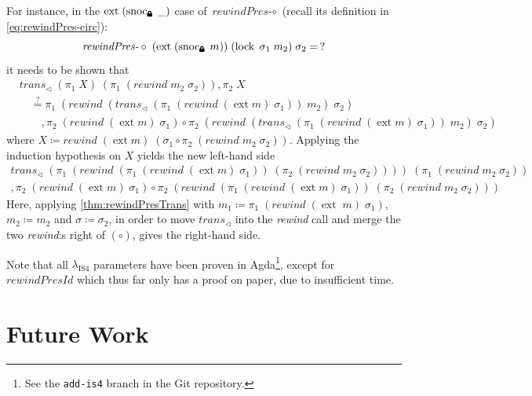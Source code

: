 \documentclass[12pt,twoside,openright]{report}
\numberwithin{equation}{chapter}
\numberwithin{figure}{chapter}
\numberwithin{table}{chapter}
\theoremstyle{definition}\newtheorem{definition}{Definition}
\newcommand{\lock}{\text{\tikz[baseline]{
      \fill[rounded corners=.1ex] (-.75ex,0) rectangle (.75ex,1ex);
      \draw[line width=.3ex] (-.4ex,.5ex) -- ++(0,.75ex) arc (180:0:.4ex) -- ++(0,-.75ex);
}}}
\begin{document}
For instance, in the $\operatorname{ext} \; (\operatorname{snoc}_\lock \; \_)$ case of $\textit{rewindPres-}\circ$
(recall its definition in \autoref{eq:rewindPres-circ}):
$$ \textit{rewindPres-}\circ \; (\operatorname{ext} \; (\operatorname{snoc}_\lock \; m)) \; (\operatorname{lock} \; \sigma_1 \; m_2) \; \sigma_2 = \, ? $$
it needs to be shown that
\begin{align*}
  &\textit{trans}_\lhd \; (\pi_1 \; X) \; (\pi_1 \; (\textit{rewind} \; m_2 \; \sigma_2)) , \pi_2 \; X \\
  &\quad \stackrel?= \pi_1 \; (\textit{rewind} \; (\textit{trans}_\lhd \; (\pi_1 \; (\textit{rewind} \; (\operatorname{ext} m) \; \sigma_1)) \; m_2) \; \sigma_2) \\
  &\qquad , \pi_2 \; (\textit{rewind} \; (\operatorname{ext} m) \; \sigma_1) \circ \pi_2 \; (\textit{rewind} \; (\textit{trans}_\lhd \; (\pi_1 \; (\textit{rewind} \; (\operatorname{ext} m) \; \sigma_1)) \; m_2) \; \sigma_2)
\end{align*}
where $X \coloneqq \textit{rewind} \; (\operatorname{ext} m) \; (\sigma_1 \circ \pi_2 \; (\textit{rewind} \; m_2 \; \sigma_2))$.
Applying the induction hypothesis on $X$ yields the new left-hand side
\begin{multline*}
  \textit{trans}_\lhd \; (\pi_1 \; (\textit{rewind} \; (\pi_1 \; (\textit{rewind} \; (\operatorname{ext} m) \; \sigma_1)) \; (\pi_2 \; (\textit{rewind} \; m_2 \; \sigma_2)))) \; (\pi_1 \; (\textit{rewind} \; m_2 \; \sigma_2)) \\
  , \pi_2 \; (\textit{rewind} \; (\operatorname{ext} m) \; \sigma_1) \circ \pi_2 \; (\textit{rewind} \; (\pi_1 \; (\textit{rewind} \; (\operatorname{ext} m) \; \sigma_1)) \; (\pi_2 \; (\textit{rewind} \; m_2 \; \sigma_2)))
\end{multline*}
Here, applying \autoref{thm:rewindPresTrans} with
$m_1 \coloneqq \pi_1 \; (\textit{rewind} \; (\operatorname{ext} \; m) \; \sigma_1)$,
$m_2 \coloneqq m_2$ and $\sigma \coloneqq \sigma_2$,
in order to move $\textit{trans}_\lhd$ into the \textit{rewind} call
and merge the two \textit{rewind}:s right of $(\circ)$,
gives the right-hand side.

Note that all $\lambda_\text{IS4}$ parameters have been proven in Agda\footnote{
See the \texttt{add-is4} branch in the Git repository.},
except for $\textit{rewindPresId}$ which thus far only has a proof on paper,
due to insufficient time.

\chapter{Future Work}
\end{document}
